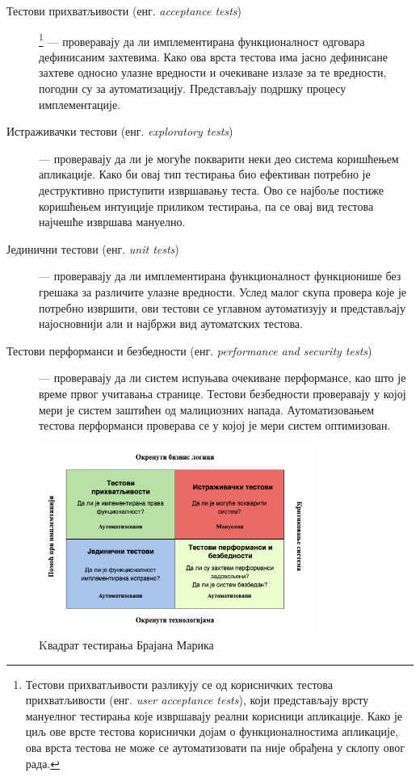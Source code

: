 \documentclass[12pt,oneside]{memoir}
\begin{document}
\begin{description}
\item[Тестови прихватљивости (енг. \textit{acceptance tests})]
\footnote{Тестови прихватљивости разликују се од корисничких тестова прихватљивости (енг. \textit{user acceptance tests}), који представљају врсту мануелног тестирања које извршавају реални корисници апликације. Како је циљ ове врсте тестова кориснички дојам о функционалностима апликације, ова врста тестова не може се аутоматизовати па није обрађена у склопу овог рада.}
--- проверавају да ли имплементирана функционалност  одговара дефинисаним захтевима. Како ова врста тестова има јасно дефинисане захтеве односно улазне вредности и очекиване излазе за те вредности, погодни су за аутоматизацију. Представљају подршку процесу имплементације.

\item[Истраживачки тестови (енг. \textit{exploratory tests})] --- проверавају да ли је могуће покварити неки део система коришћењем апликације. Како би овај тип тестирања био ефективан потребно је деструктивно приступити извршавању теста. Ово се најбоље постиже коришћењем интуиције приликом тестирања, па се овај вид тестова најчешће извршава мануелно.

\item[Јединични тестови (енг. \textit{unit tests})] --- проверавају да ли имплементирана функционалност функционише без грешака за различите улазне вредности. Услед малог скупа провера које је потребно извршити, ови тестови се углавном аутоматизују и представљају најосновнији али и најбржи вид аутоматских тестова.

\item[Тестови перформанси и безбедности (енг. \textit{performance and security tests})]  --- проверавају да ли систем испуњава очекиване перформансе, као што је време првог учитавања странице. Тестови безбедности проверавају у којој мери је систем заштићен од малициозних напада. Аутоматизовањем тестова перформанси проверава се у којој је мери систем оптимизован.
\end{description}



\begin{figure}[!ht]
  \centering
  \includegraphics[width=0.8\textwidth]{matfmaster/img/kvadrat2.png}
  \caption{Kвадрат тестирања Брајана Марика}
  \label{fig:kvadrat}
\end{figure}
\end{document}
